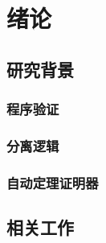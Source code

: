 \chapter{绪论}
\label{chap:intro}

\section{研究背景}
\subsection{程序验证}
\subsection{分离逻辑}
\subsection{自动定理证明器}
\subsection{}
\section{相关工作}
\section{}
